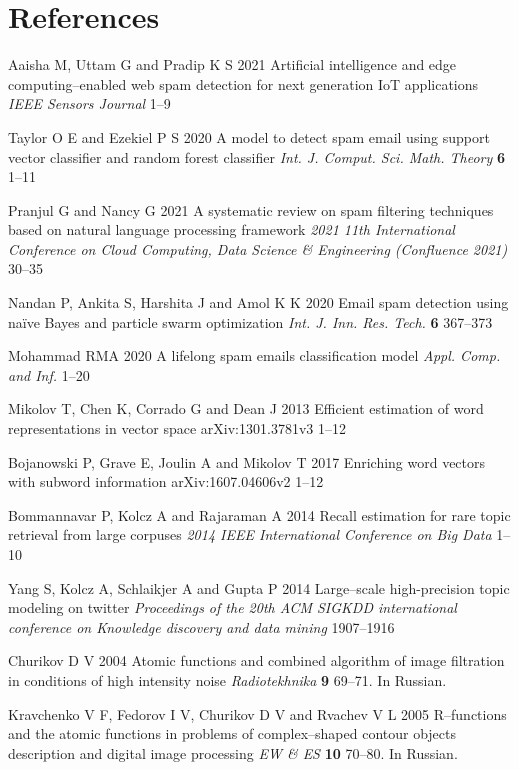 \documentclass[12pt]{jpconf}
\begin{document}
\section*{References}
\begin{thebibliography}{99}
Aaisha M, Uttam G and Pradip K S
2021 {Artificial intelligence and edge computing--enabled
web spam detection for next generation IoT
applications} {\it IEEE Sensors Journal} {\bf } 1--9

Taylor O E and Ezekiel P S
2020 {A model to detect spam email using support vector classifier and random forest classifier} 
\emph{Int. J. Comput. Sci. Math. Theory} {\bf 6} 1--11

Pranjul G and Nancy G
2021 {A systematic review on spam filtering techniques based on
natural language processing framework} \emph{2021 11th International Conference on Cloud Computing, Data Science \& Engineering (Confluence 2021)} 30--35

Nandan P, Ankita S, Harshita J and Amol K K
2020 {Email spam detection using naïve Bayes and particle swarm optimization} \emph{Int. J. Inn. Res. Tech.} {\bf 6} 367--373

Mohammad RMA
2020 {A lifelong spam emails classification model}
\emph{Appl. Comp. and Inf.} 1--20

Mikolov T, Chen K, Corrado G and Dean J
2013 {Efficient estimation of word representations in vector space} 
arXiv:1301.3781v3 1--12

Bojanowski P, Grave E, Joulin A and Mikolov T
2017 {Enriching word vectors with subword information} 
arXiv:1607.04606v2 1--12

Bommannavar P, Kolcz A and Rajaraman A
2014 {Recall estimation for rare topic retrieval from large corpuses}
\emph{2014 IEEE International Conference on Big Data} 1--10

Yang S, Kolcz A, Schlaikjer A and Gupta P
2014 {Large--scale high-precision topic modeling on twitter} 
\emph{Proceedings of the 20th ACM SIGKDD international conference on Knowledge discovery and data mining} 1907--1916

 Churikov D V 2004
{Atomic functions and combined algorithm of image filtration in conditions of high intensity noise}
\emph{Radiotekhnika} \textbf{9} 69--71. In Russian.

Kravchenko V F, Fedorov I V, Churikov D V and Rvachev V L 2005 
{R--functions and the atomic functions in problems of complex--shaped contour objects description and digital image processing}
\emph{EW \& ES} \textbf{10} 70--80. In Russian.
\end{thebibliography}
\end{document}
